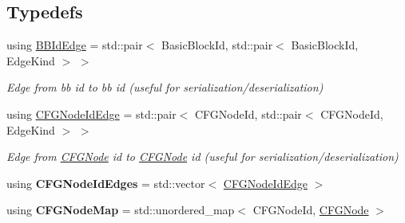 \subsection*{Typedefs}
\begin{DoxyCompactItemize}
\item 
\mbox{\label{namespacespan_1_1ir_1_1object_aa260674d7902a7f6909b451361ab65fa}} 
using \hyperlink{namespacespan_1_1ir_1_1object_aa260674d7902a7f6909b451361ab65fa}{B\+B\+Id\+Edge} = std\+::pair$<$ Basic\+Block\+Id, std\+::pair$<$ Basic\+Block\+Id, Edge\+Kind $>$ $>$
\begin{DoxyCompactList}\small\item\em Edge from bb id to bb id (useful for serialization/deserialization) \end{DoxyCompactList}\item 
\mbox{\label{namespacespan_1_1ir_1_1object_ad9072c15351c446d2051be5439f2b979}} 
using \hyperlink{namespacespan_1_1ir_1_1object_ad9072c15351c446d2051be5439f2b979}{C\+F\+G\+Node\+Id\+Edge} = std\+::pair$<$ C\+F\+G\+Node\+Id, std\+::pair$<$ C\+F\+G\+Node\+Id, Edge\+Kind $>$ $>$
\begin{DoxyCompactList}\small\item\em Edge from \hyperlink{classspan_1_1ir_1_1object_1_1CFGNode}{C\+F\+G\+Node} id to \hyperlink{classspan_1_1ir_1_1object_1_1CFGNode}{C\+F\+G\+Node} id (useful for serialization/deserialization) \end{DoxyCompactList}\item 
\mbox{\label{namespacespan_1_1ir_1_1object_af57b0b2ff157cfcd32dadb6f67920065}} 
using {\bfseries C\+F\+G\+Node\+Id\+Edges} = std\+::vector$<$ \hyperlink{namespacespan_1_1ir_1_1object_ad9072c15351c446d2051be5439f2b979}{C\+F\+G\+Node\+Id\+Edge} $>$
\item 
\mbox{\label{namespacespan_1_1ir_1_1object_ab9acd8de65685eea78dc7e43c857a90c}} 
using {\bfseries C\+F\+G\+Node\+Map} = std\+::unordered\+\_\+map$<$ C\+F\+G\+Node\+Id, \hyperlink{classspan_1_1ir_1_1object_1_1CFGNode}{C\+F\+G\+Node} $>$
\end{DoxyCompactItemize}
